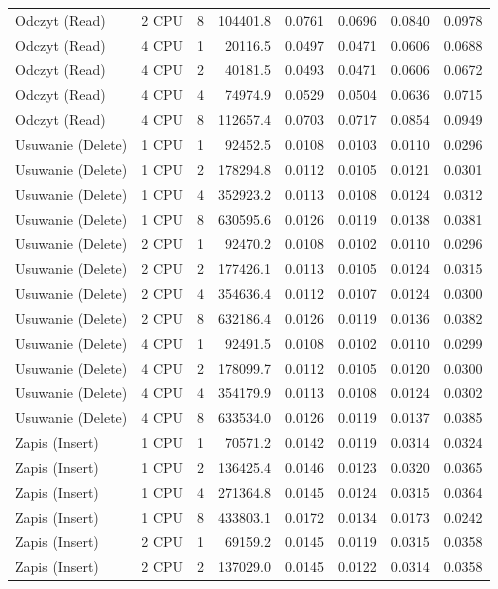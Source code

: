 \begin{table}[ht]
{\begin{tabular}{llcrrrrr}
Odczyt (Read) & 2 CPU & 8 & 104401.8 & 0.0761 & 0.0696 & 0.0840 & 0.0978 \\
Odczyt (Read) & 4 CPU & 1 & 20116.5 & 0.0497 & 0.0471 & 0.0606 & 0.0688 \\
Odczyt (Read) & 4 CPU & 2 & 40181.5 & 0.0493 & 0.0471 & 0.0606 & 0.0672 \\
Odczyt (Read) & 4 CPU & 4 & 74974.9 & 0.0529 & 0.0504 & 0.0636 & 0.0715 \\
Odczyt (Read) & 4 CPU & 8 & 112657.4 & 0.0703 & 0.0717 & 0.0854 & 0.0949 \\
Usuwanie (Delete) & 1 CPU & 1 & 92452.5 & 0.0108 & 0.0103 & 0.0110 & 0.0296 \\
Usuwanie (Delete) & 1 CPU & 2 & 178294.8 & 0.0112 & 0.0105 & 0.0121 & 0.0301 \\
Usuwanie (Delete) & 1 CPU & 4 & 352923.2 & 0.0113 & 0.0108 & 0.0124 & 0.0312 \\
Usuwanie (Delete) & 1 CPU & 8 & 630595.6 & 0.0126 & 0.0119 & 0.0138 & 0.0381 \\
Usuwanie (Delete) & 2 CPU & 1 & 92470.2 & 0.0108 & 0.0102 & 0.0110 & 0.0296 \\
Usuwanie (Delete) & 2 CPU & 2 & 177426.1 & 0.0113 & 0.0105 & 0.0124 & 0.0315 \\
Usuwanie (Delete) & 2 CPU & 4 & 354636.4 & 0.0112 & 0.0107 & 0.0124 & 0.0300 \\
Usuwanie (Delete) & 2 CPU & 8 & 632186.4 & 0.0126 & 0.0119 & 0.0136 & 0.0382 \\
Usuwanie (Delete) & 4 CPU & 1 & 92491.5 & 0.0108 & 0.0102 & 0.0110 & 0.0299 \\
Usuwanie (Delete) & 4 CPU & 2 & 178099.7 & 0.0112 & 0.0105 & 0.0120 & 0.0300 \\
Usuwanie (Delete) & 4 CPU & 4 & 354179.9 & 0.0113 & 0.0108 & 0.0124 & 0.0302 \\
Usuwanie (Delete) & 4 CPU & 8 & 633534.0 & 0.0126 & 0.0119 & 0.0137 & 0.0385 \\
Zapis (Insert) & 1 CPU & 1 & 70571.2 & 0.0142 & 0.0119 & 0.0314 & 0.0324 \\
Zapis (Insert) & 1 CPU & 2 & 136425.4 & 0.0146 & 0.0123 & 0.0320 & 0.0365 \\
Zapis (Insert) & 1 CPU & 4 & 271364.8 & 0.0145 & 0.0124 & 0.0315 & 0.0364 \\
Zapis (Insert) & 1 CPU & 8 & 433803.1 & 0.0172 & 0.0134 & 0.0173 & 0.0242 \\
Zapis (Insert) & 2 CPU & 1 & 69159.2 & 0.0145 & 0.0119 & 0.0315 & 0.0358 \\
Zapis (Insert) & 2 CPU & 2 & 137029.0 & 0.0145 & 0.0122 & 0.0314 & 0.0358 \\

\end{tabular}}
\end{table}

